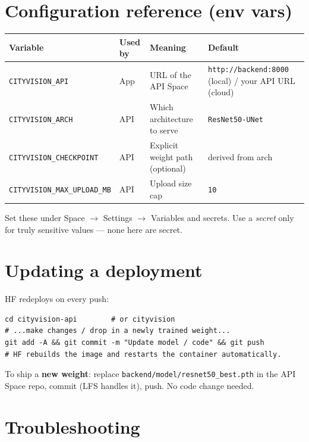\documentclass[11pt]{article}
\newcommand{\code}[1]{\lstinline[basicstyle=\ttfamily\normalsize]|#1|}
\newcommand{\rarr}{$\rightarrow$}
\begin{document}
\section{Configuration reference (env vars)}

\begin{tabularx}{\linewidth}{@{}llXp{3.3cm}@{}}
\toprule
\textbf{Variable} & \textbf{Used by} & \textbf{Meaning} & \textbf{Default} \\
\midrule
\code{CITYVISION_API} & App & URL of the API Space & \code{http://backend:8000}
(local) / your API URL (cloud) \\
\addlinespace
\code{CITYVISION_ARCH} & API & Which architecture to serve & \code{ResNet50-UNet} \\
\addlinespace
\code{CITYVISION_CHECKPOINT} & API & Explicit weight path (optional) & derived from
arch \\
\addlinespace
\code{CITYVISION_MAX_UPLOAD_MB} & API & Upload size cap & \code{10} \\
\bottomrule
\end{tabularx}

\medskip
Set these under Space \rarr{} Settings \rarr{} Variables and secrets. Use a
\emph{secret} only for truly sensitive values --- none here are secret.

\section{Updating a deployment}

HF redeploys on every push:
\begin{lstlisting}[style=block]
cd cityvision-api        # or cityvision
# ...make changes / drop in a newly trained weight...
git add -A && git commit -m "Update model / code" && git push
# HF rebuilds the image and restarts the container automatically.
\end{lstlisting}
To ship a \textbf{new weight}: replace \code{backend/model/resnet50_best.pth} in the
API Space repo, commit (LFS handles it), push. No code change needed.

\section{Troubleshooting}
\end{document}
